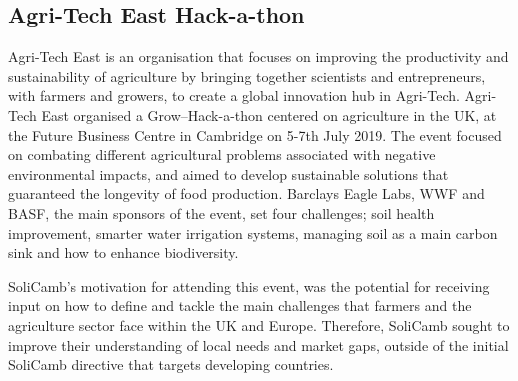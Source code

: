 
 
\subsection{Agri-Tech East Hack-a-thon}
Agri-Tech East is an organisation that focuses on improving the productivity and sustainability of agriculture by bringing together scientists and entrepreneurs, with farmers and growers, to create a global innovation hub in Agri-Tech. Agri-Tech East organised a Grow--Hack-a-thon centered on agriculture in the UK, at the Future Business Centre in Cambridge on 5-7th July 2019. 
The event focused on combating different agricultural problems associated with negative environmental impacts, and aimed to develop sustainable solutions that guaranteed the longevity of food production.
Barclays Eagle Labs, WWF and BASF, the main sponsors of the event, set four challenges; soil health improvement, smarter water irrigation systems, managing soil as a main carbon sink and how to enhance biodiversity.

SoliCamb's motivation for attending this event, was the potential for receiving input on how to define and tackle the main challenges that farmers and the agriculture sector face within the UK and Europe. Therefore, SoliCamb sought to improve their understanding of local needs and market gaps, outside of the initial SoliCamb directive that targets developing countries. 

